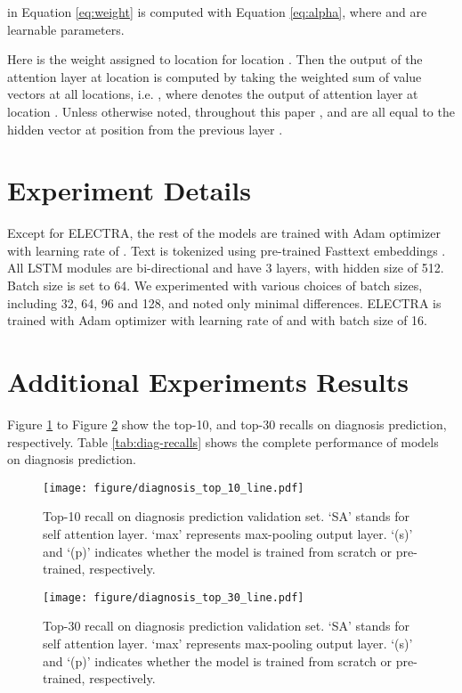 \documentclass[11pt,a4paper]{article}
\begin{document}
 in Equation \ref{eq:weight} is computed with Equation \ref{eq:alpha}, where  and  are learnable parameters.



Here  is the weight assigned to location  for location . Then the output of the attention layer at location  is computed by taking the weighted sum of value vectors at all locations, i.e. , where  denotes the output of attention layer at location . Unless otherwise noted, throughout this paper ,  and  are all equal to the hidden vector at position  from the previous layer .

\section{Experiment Details}\label{app:exp-setup}

Except for ELECTRA, the rest of the models are trained with Adam optimizer \citep{Kingma2014} with learning rate of . Text is tokenized using pre-trained Fasttext embeddings \citep{Bojanowski2017EnrichingInformation}. All LSTM modules are bi-directional and have 3 layers, with hidden size of 512. Batch size is set to 64. We experimented with various choices of batch sizes, including 32, 64, 96 and 128, and noted only minimal differences. ELECTRA is trained with Adam optimizer with learning rate of  and with batch size of 16.

\section{Additional Experiments Results}\label{app:add-results}

Figure \ref{fig:top-10-line} to Figure \ref{fig:top-30-line} show the top-10, and top-30 recalls on diagnosis prediction, respectively. Table \ref{tab:diag-recalls} shows the complete performance of models on diagnosis prediction.

\begin{figure}[hp]
    \centering
    \texttt{[image: figure/diagnosis\_top\_10\_line.pdf]}
    \caption{Top-10 recall on diagnosis prediction validation set. `SA' stands for self attention layer. `max' represents max-pooling output layer. `(s)' and `(p)' indicates whether the model is trained from scratch or pre-trained, respectively.}
    \label{fig:top-10-line}
\end{figure}

\begin{figure}[hp]
    \centering
    \texttt{[image: figure/diagnosis\_top\_30\_line.pdf]}
    \caption{Top-30 recall on diagnosis prediction validation set. `SA' stands for self attention layer. `max' represents max-pooling output layer. `(s)' and `(p)' indicates whether the model is trained from scratch or pre-trained, respectively.}
    \label{fig:top-30-line}
\end{figure}
\end{document}
